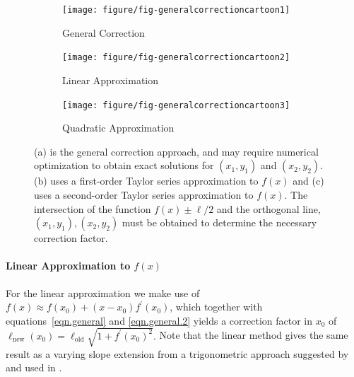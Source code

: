 \documentclass[12pt]{article}\usepackage[]{graphicx}\usepackage[]{color}
\begin{document}
\begin{figure}[h!]\centering
\begin{subfigure}[t]{0.3\textwidth}\centering
\texttt{[image: figure/fig-generalcorrectioncartoon1]}
\caption{General Correction}\label{fig:GeneralCorrection}
\end{subfigure}\hfill
\begin{subfigure}[t]{0.3\textwidth}\centering
\texttt{[image: figure/fig-generalcorrectioncartoon2]}
\caption{Linear Approximation}\label{fig:linear-GeneralCorrection}
\end{subfigure}\hfill
\begin{subfigure}[t]{0.3\textwidth}\centering
\texttt{[image: figure/fig-generalcorrectioncartoon3]}
\caption{Quadratic Approximation}\label{fig:quadratic-GeneralCorrection}
\end{subfigure}
\caption[Methods based on Approximations to f(x)]{(a) is the general correction approach, and may require numerical optimization to obtain exact solutions for $(x_1, y_1)$ and $(x_2, y_2)$. (b) uses a first-order Taylor series approximation to $f(x)$ and (c) uses a second-order Taylor series approximation to $f(x)$. The intersection of the function $f(x) \pm \ell/2$ and the orthogonal line,  $(x_1, y_1), (x_2, y_2)$ must be obtained to determine the necessary correction factor.}\label{fig:linear.quadratic} 
\end{figure}

\paragraph{Linear Approximation to $f(x)$}\hfill\newline
For the linear approximation we make use of $f(x) \approx f(x_0) + (x - x_0) f^\prime(x_0)$, which together with  equations~\ref{eqn.general} and \ref{eqn.general.2} yields a correction factor in $x_0$ of
$
\ell_{\text{new}}(x_0) = \ell_{\text{old}} \sqrt{1 +  f^\prime(x_0)^2}.
$
% 
Note that the linear method gives the same result as a varying slope extension from a trigonometric approach  suggested by \citet{schonlau:2003} and used in \citet{marie:2013}.
\end{document}
